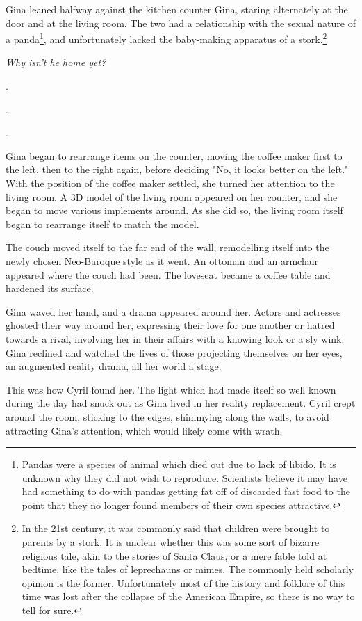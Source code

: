\documentclass[12pt]{book}
\begin{document}
Gina leaned halfway against the kitchen counter Gina, staring alternately at the door and at the living room. The two had a relationship with the sexual nature of a panda\footnote{Pandas were a species of animal which died out due to lack of libido. It is unknown why they did not wish to reproduce. Scientists believe it may have had something to do with pandas getting fat off of discarded fast food to the point that they no longer found members of their own species attractive.}, and unfortunately lacked the baby-making apparatus of a stork.\footnote{In the 21st century, it was commonly said that children were brought to parents by a stork. It is unclear whether this was some sort of bizarre religious tale, akin to the stories of Santa Claus, or a mere fable told at bedtime, like the tales of leprechauns or mimes. The commonly held scholarly opinion is the former. Unfortunately most of the history and folklore of this time was lost after the collapse of the American Empire, so there is no way to tell for sure.}

\emph{Why isn't he home yet?}

.

.

.

Gina began to rearrange items on the counter, moving the coffee maker first to the left, then to the right again, before deciding "No, it looks better on the left." With the position of the coffee maker settled, she turned her attention to the living room. A 3D model of the living room appeared on her counter, and she began to move various implements around. As she did so, the living room itself began to rearrange itself to match the model.

The couch moved itself to the far end of the wall, remodelling itself into the newly chosen Neo-Baroque style as it went. An ottoman and an armchair appeared where the couch had been. The loveseat became a coffee table and hardened its surface.

Gina waved her hand, and a drama appeared around her. Actors and actresses ghosted their way around her, expressing their love for one another or hatred towards a rival, involving her in their affairs with a knowing look or a sly wink. Gina reclined and watched the lives of those projecting themselves on her eyes, an augmented reality drama, all her world a stage.

This was how Cyril found her. The light which had made itself so well known during the day had snuck out as Gina lived in her reality replacement. Cyril crept around the room, sticking to the edges, shimmying along the walls, to avoid attracting Gina's attention, which would likely come with wrath.
\end{document}
